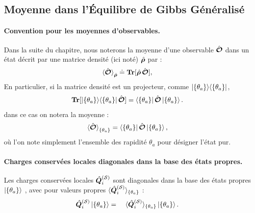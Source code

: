 \subsection{Moyenne dans l'Équilibre de Gibbs Généralisé}

\paragraph{Convention pour les moyennes d'observables.}
Dans la suite du chapitre, nous noterons la moyenne d’une observable $\hat{\bm{\mathcal{O}}}$ dans un état décrit par une matrice densité (ici noté) $\hat{\bm{\rho}}$ par :
\begin{eqnarray}\label{chap.TBA.moy.dens}	
	\braket{\hat{\bm{\mathcal{O}}}}_{\hat{\bm{\rho}}} \doteq \bm{\mathrm{Tr}}[\hat{\bm{\rho}} \, \hat{\bm{\mathcal{O}}}],
\end{eqnarray}
En particulier, si la matrice densité est un projecteur, comme $\ket{\{\theta_a \}}\!\bra{\{\theta_a \}}$, \[\bm{\mathrm{Tr}}[\ket{\{\theta_a \}}\!\bra{\{\theta_a \}} \hat{\bm{\mathcal{O}}}] =  \bra{\{\theta_a \}}\hat{\bm{\mathcal{O}}}\ket{\{\theta_a \}}.\] dans ce cas on notera la moyenne :
\begin{eqnarray}\label{chap.TBA.moy.dens.pur}
	\braket{\hat{\bm{\mathcal{O}}}}_{\{\theta_a \}} = \bra{\{\theta_a \}} \hat{\bm{\mathcal{O}}} \ket{\{\theta_a \}},
\end{eqnarray}
où l’on note simplement l’ensemble des rapidité ${\theta_a}$ pour désigner l’état pur.

\paragraph{Charges conservées locales diagonales dans la base des états propres.}
Les charges conservées locales $\hat{\bm{Q}}_i^{(\mathcal{S})}$ sont diagonales dans la base des  états propres $\ket{ \{ \theta_a \}}$ , avec pour valeurs propres $\langle \hat{\bm{Q}}_i^{(\mathcal{S})} \rangle_{\{\theta_a \}} $ 	 :
\begin{eqnarray}\label{chap.TBA.Qi.diag}
	\operator{Q}_i^{(\mathcal{S})}\ket{\{\theta_a \}} & = &  \langle \operator{Q}_i^{(\mathcal{S})} \rangle_{\{\theta_a \}}  \ket{\{\theta_a \}}.		
\end{eqnarray}
